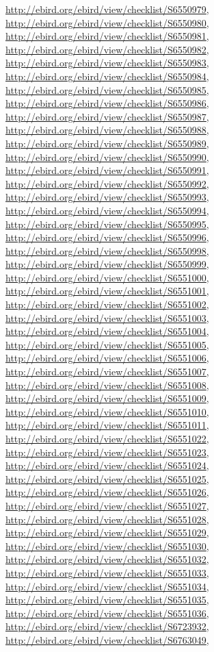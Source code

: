 \documentclass[9pt, article]{memoir}
\begin{document}
\begin{multicols}{2}
\url{http://ebird.org/ebird/view/checklist/S6550979}, 
\url{http://ebird.org/ebird/view/checklist/S6550980}, 
\url{http://ebird.org/ebird/view/checklist/S6550981}, 
\url{http://ebird.org/ebird/view/checklist/S6550982}, 
\url{http://ebird.org/ebird/view/checklist/S6550983}, 
\url{http://ebird.org/ebird/view/checklist/S6550984}, 
\url{http://ebird.org/ebird/view/checklist/S6550985}, 
\url{http://ebird.org/ebird/view/checklist/S6550986}, 
\url{http://ebird.org/ebird/view/checklist/S6550987}, 
\url{http://ebird.org/ebird/view/checklist/S6550988}, 
\url{http://ebird.org/ebird/view/checklist/S6550989}, 
\url{http://ebird.org/ebird/view/checklist/S6550990}, 
\url{http://ebird.org/ebird/view/checklist/S6550991}, 
\url{http://ebird.org/ebird/view/checklist/S6550992}, 
\url{http://ebird.org/ebird/view/checklist/S6550993}, 
\url{http://ebird.org/ebird/view/checklist/S6550994}, 
\url{http://ebird.org/ebird/view/checklist/S6550995}, 
\url{http://ebird.org/ebird/view/checklist/S6550996}, 
\url{http://ebird.org/ebird/view/checklist/S6550998}, 
\url{http://ebird.org/ebird/view/checklist/S6550999}, 
\url{http://ebird.org/ebird/view/checklist/S6551000}, 
\url{http://ebird.org/ebird/view/checklist/S6551001}, 
\url{http://ebird.org/ebird/view/checklist/S6551002}, 
\url{http://ebird.org/ebird/view/checklist/S6551003}, 
\url{http://ebird.org/ebird/view/checklist/S6551004}, 
\url{http://ebird.org/ebird/view/checklist/S6551005}, 
\url{http://ebird.org/ebird/view/checklist/S6551006}, 
\url{http://ebird.org/ebird/view/checklist/S6551007}, 
\url{http://ebird.org/ebird/view/checklist/S6551008}, 
\url{http://ebird.org/ebird/view/checklist/S6551009}, 
\url{http://ebird.org/ebird/view/checklist/S6551010}, 
\url{http://ebird.org/ebird/view/checklist/S6551011}, 
\url{http://ebird.org/ebird/view/checklist/S6551022}, 
\url{http://ebird.org/ebird/view/checklist/S6551023}, 
\url{http://ebird.org/ebird/view/checklist/S6551024}, 
\url{http://ebird.org/ebird/view/checklist/S6551025}, 
\url{http://ebird.org/ebird/view/checklist/S6551026}, 
\url{http://ebird.org/ebird/view/checklist/S6551027}, 
\url{http://ebird.org/ebird/view/checklist/S6551028}, 
\url{http://ebird.org/ebird/view/checklist/S6551029}, 
\url{http://ebird.org/ebird/view/checklist/S6551030}, 
\url{http://ebird.org/ebird/view/checklist/S6551032}, 
\url{http://ebird.org/ebird/view/checklist/S6551033}, 
\url{http://ebird.org/ebird/view/checklist/S6551034}, 
\url{http://ebird.org/ebird/view/checklist/S6551035}, 
\url{http://ebird.org/ebird/view/checklist/S6551036}, 
\url{http://ebird.org/ebird/view/checklist/S6723932}, 
\url{http://ebird.org/ebird/view/checklist/S6763049}, 

\end{multicols}
\end{document}
